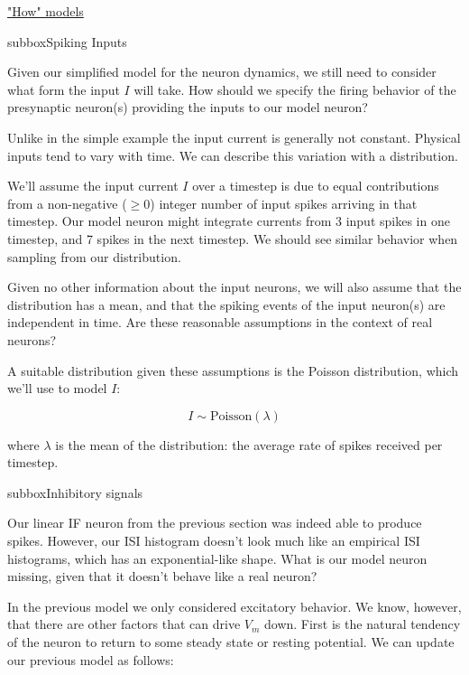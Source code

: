 \begin{textbox}{\href{https://compneuro.neuromatch.io/tutorials/W1D1_ModelTypes/student/W1D1_Tutorial2.html}{"How" models } }

\begin{subbox}{subbox}{Spiking Inputs}
\scriptsize

Given our simplified model for the neuron dynamics, we still need to consider what form the input $I$ will take. How should we specify the firing behavior of the presynaptic neuron(s) providing the inputs to our model neuron? 

Unlike in the simple example the input current is generally not constant. Physical inputs tend to vary with time. We can describe this variation with a distribution.

We'll assume the input current $I$ over a timestep is due to equal contributions from a non-negative ($\ge 0$) integer number of input spikes arriving in that timestep. Our model neuron might integrate currents from 3 input spikes in one timestep, and 7 spikes in the next timestep. We should see similar behavior when sampling from our distribution.

Given no other information about the input neurons, we will also assume that the distribution has a mean, and that the spiking events of the input neuron(s) are independent in time. Are these reasonable assumptions in the context of real neurons?

A suitable distribution given these assumptions is the Poisson distribution, which we'll use to model $I$:

\begin{equation}
I \sim \mathrm{Poisson}(\lambda)
\end{equation}

where $\lambda$ is the mean of the distribution: the average rate of spikes received per timestep.

\end{subbox}
\begin{subbox}{subbox}{Inhibitory signals}
\scriptsize

Our linear IF neuron from the previous section was indeed able to produce spikes. However, our ISI histogram doesn't look much like an empirical ISI histograms, which has an exponential-like shape. What is our model neuron missing, given that it doesn't behave like a real neuron?

In the previous model we only considered excitatory behavior. We know, however, that there are other factors that can drive $V_m$ down. First is the natural tendency of the neuron to return to some steady state or resting potential. We can update our previous model as follows:


\end{subbox}
\end{textbox}
